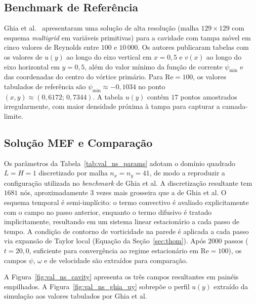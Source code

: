 \subsection{Benchmark de Referência}

Ghia et al.\ \cite{Ghia1982} apresentaram uma solução de alta resolução (malha $129 \times 129$ com esquema \emph{multigrid} em variáveis primitivas) para a cavidade com tampa móvel em cinco valores de Reynolds entre $100$ e $10\,000$. Os autores publicaram tabelas com os valores de $u(y)$ ao longo do eixo vertical em $x = 0{,}5$ e $v(x)$ ao longo do eixo horizontal em $y = 0{,}5$, além do valor mínimo da função de corrente $\psi_{\min}$ e das coordenadas do centro do vórtice primário. Para $\mathrm{Re} = 100$, os valores tabulados de referência são $\psi_{\min} \approx -0{,}1034$ no ponto $(x,y) \approx (0{,}6172;\, 0{,}7344)$. A tabela $u(y)$ contém $17$ pontos amostrados irregularmente, com maior densidade próxima à tampa para capturar a camada-limite.

\subsection{Solução MEF e Comparação}

Os parâmetros da Tabela~\ref{tab:val_ns_params} adotam o domínio quadrado $L = H = 1$ discretizado por malha $n_x = n_y = 41$, de modo a reproduzir a configuração utilizada no \emph{benchmark} de Ghia et al. A discretização resultante tem $1681$ nós, aproximadamente $3$ vezes mais grosseira que a de Ghia et al. O esquema temporal é semi-implícito: o termo convectivo é avaliado explicitamente com o campo no passo anterior, enquanto o termo difusivo é tratado implicitamente, resultando em um sistema linear estacionário a cada passo de tempo. A condição de contorno de vorticidade na parede é aplicada a cada passo via expansão de Taylor local (Equação da Seção~\ref{sec:thom}). Após $2000$ passos ($t = 20{,}0$, suficiente para convergência ao regime estacionário em $\mathrm{Re} = 100$), os campos $\psi$, $\omega$ e de velocidade são extraídos para comparação.

A Figura~\ref{fig:val_ns_cavity} apresenta os três campos resultantes em painéis empilhados. A Figura~\ref{fig:val_ns_ghia_uy} sobrepõe o perfil $u(y)$ extraído da simulação aos valores tabulados por Ghia et al.

